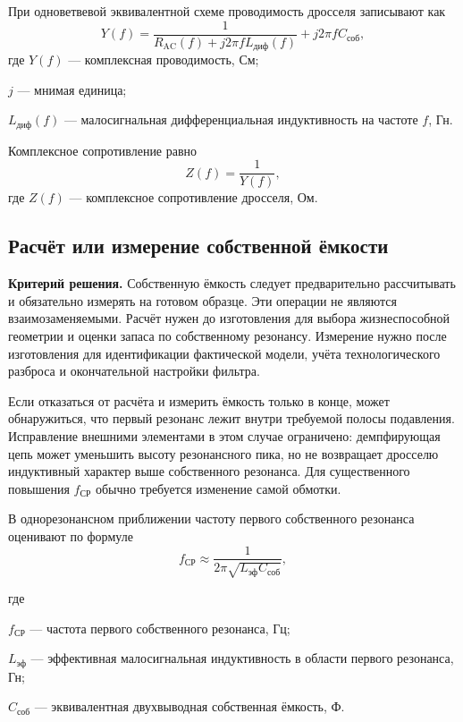 \documentclass[14pt,a4paper]{extarticle}
\newcommand{\criterion}{\par\noindent\textbf{Критерий решения.} }
\newenvironment{whereblock}
 {\par\noindent где\par
  \begin{list}{}{\setlength{\leftmargin}{12.5mm}
                  \setlength{\itemindent}{-12.5mm}
                  \setlength{\itemsep}{0pt}
                  \setlength{\parsep}{0pt}
                  \setlength{\topsep}{0pt}}}
 {\end{list}}
\newcommand{\whereitem}[2]{\item[] #1 --- #2}
\begin{document}
При одноветвевой эквивалентной схеме проводимость дросселя записывают как
\begin{equation}
 Y(f)=
 \frac{1}{R_{\text{AC}}(f)+j2\pi fL_{\text{диф}}(f)}
 +j2\pi f C_{\text{соб}},
 \label{eq:admittance}
\end{equation}
где $Y(f)$ --- комплексная проводимость, См;\par\noindent
$j$ --- мнимая единица;\par\noindent
$L_{\text{диф}}(f)$ --- малосигнальная дифференциальная индуктивность на
частоте $f$, Гн.

Комплексное сопротивление равно
\begin{equation}
 Z(f)=\frac{1}{Y(f)},
 \label{eq:impedance}
\end{equation}
где $Z(f)$ --- комплексное сопротивление дросселя, Ом.

\subsection{Расчёт или измерение собственной ёмкости}
\label{subsec:calculate-or-measure-capacitance}

\criterion Собственную ёмкость следует предварительно рассчитывать и
обязательно измерять на готовом образце. Эти операции не являются
взаимозаменяемыми. Расчёт нужен до изготовления для выбора жизнеспособной
геометрии и оценки запаса по собственному резонансу. Измерение нужно после
изготовления для идентификации фактической модели, учёта технологического
разброса и окончательной настройки фильтра.

Если отказаться от расчёта и измерить ёмкость только в конце, может
обнаружиться, что первый резонанс лежит внутри требуемой полосы подавления.
Исправление внешними элементами в этом случае ограничено: демпфирующая цепь
может уменьшить высоту резонансного пика, но не возвращает дросселю
индуктивный характер выше собственного резонанса. Для существенного повышения
$f_{\text{СР}}$ обычно требуется изменение самой обмотки.

В однорезонансном приближении частоту первого собственного резонанса
оценивают по формуле
\begin{equation}
 f_{\text{СР}}\approx
 \frac{1}{2\pi\sqrt{L_{\text{эф}}C_{\text{соб}}}},
 \label{eq:self-resonance-frequency}
\end{equation}
\begin{whereblock}
\whereitem{$f_{\text{СР}}$}{частота первого собственного резонанса, Гц;}
\whereitem{$L_{\text{эф}}$}{эффективная малосигнальная индуктивность в
области первого резонанса, Гн;}
\whereitem{$C_{\text{соб}}$}{эквивалентная двухвыводная собственная ёмкость,
Ф.}
\end{whereblock}
\end{document}
